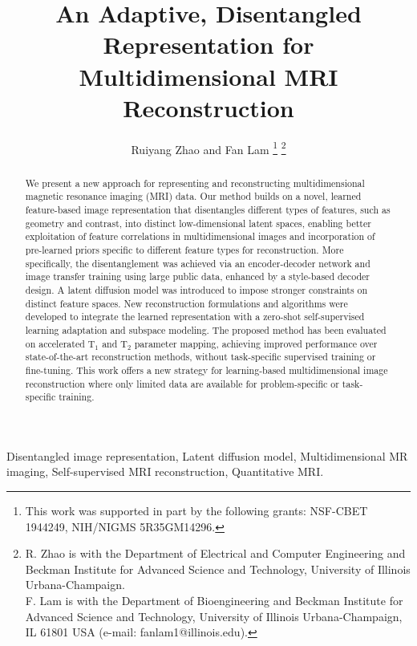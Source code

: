 \documentclass[journal,twoside,web]{ieeecolor}
\begin{document}
\title{An Adaptive, Disentangled Representation for Multidimensional MRI Reconstruction}

\author{Ruiyang Zhao and Fan Lam
\thanks{
This work was supported in part by the following grants: NSF-CBET 1944249, NIH/NIGMS 5R35GM14296.  }
\thanks{R. Zhao is with the Department of Electrical and Computer Engineering and Beckman Institute for Advanced Science and Technology, University of Illinois Urbana-Champaign.\\
\indent F. Lam is with the Department of Bioengineering and Beckman Institute for Advanced Science and Technology, University of Illinois Urbana-Champaign, IL 61801 USA (e-mail: fanlam1@illinois.edu).}}
\maketitle

\begin{abstract}
We present a new approach for representing and reconstructing multidimensional magnetic resonance imaging (MRI) data. Our method builds on a novel, learned feature-based image representation that disentangles different types of features, such as geometry and contrast, into distinct low-dimensional latent spaces, enabling better exploitation of feature correlations in multidimensional images and incorporation of pre-learned priors specific to different feature types for reconstruction. More specifically, the disentanglement was achieved via an encoder-decoder network and image transfer training using large public data, enhanced by a style-based decoder design. A latent diffusion model was introduced to impose stronger constraints on distinct feature spaces. New reconstruction formulations and algorithms were developed to integrate the learned representation with a zero-shot self-supervised learning adaptation and subspace modeling. The proposed method has been evaluated on accelerated $\text{T}_1$ and $\text{T}_2$ parameter mapping, achieving improved performance over state-of-the-art reconstruction methods, without task-specific supervised training or fine-tuning. This work offers a new strategy for learning-based multidimensional image reconstruction where only limited data are available for problem-specific or task-specific training.
\end{abstract}

\begin{IEEEkeywords}
Disentangled image representation, Latent diffusion model, Multidimensional MR imaging, Self-supervised MRI reconstruction, Quantitative MRI.
\end{IEEEkeywords}
\end{document}
